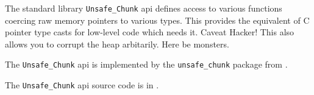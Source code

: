 
The standard library {\tt Unsafe\_Chunk} api defines access to various functions 
coercing raw memory pointers to various types.  This provides the equivalent of 
C pointer type casts for low-level code which needs it.  Caveat Hacker!  This 
also allows you to corrupt the heap arbitarily.  Here be monsters.

The {\tt Unsafe\_Chunk} api is implemented by the 
{\tt unsafe\_chunk} package from 
.

The {\tt Unsafe\_Chunk} api source code is in .

